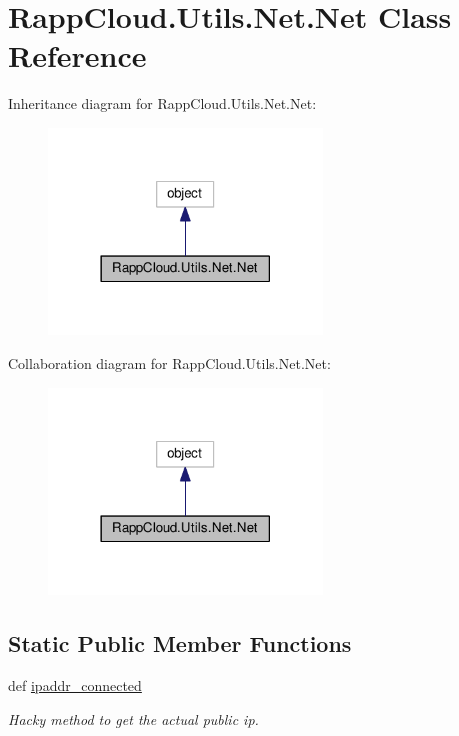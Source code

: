 \hypertarget{classRappCloud_1_1Utils_1_1Net_1_1Net}{\section{Rapp\-Cloud.\-Utils.\-Net.\-Net Class Reference}
\label{classRappCloud_1_1Utils_1_1Net_1_1Net}
}


Inheritance diagram for Rapp\-Cloud.\-Utils.\-Net.\-Net\-:
\nopagebreak
\begin{figure}[H]
\begin{center}
\leavevmode
\includegraphics[width=206pt]{classRappCloud_1_1Utils_1_1Net_1_1Net__inherit__graph}
\end{center}
\end{figure}


Collaboration diagram for Rapp\-Cloud.\-Utils.\-Net.\-Net\-:
\nopagebreak
\begin{figure}[H]
\begin{center}
\leavevmode
\includegraphics[width=206pt]{classRappCloud_1_1Utils_1_1Net_1_1Net__coll__graph}
\end{center}
\end{figure}
\subsection*{Static Public Member Functions}
\begin{DoxyCompactItemize}
\item 
def \hyperlink{classRappCloud_1_1Utils_1_1Net_1_1Net_aff948b0d562ba88f91b462a3b1c9cd2c}{ipaddr\-\_\-connected}
\begin{DoxyCompactList}\small\item\em Hacky method to get the actual public ip. \end{DoxyCompactList}\end{DoxyCompactItemize}


